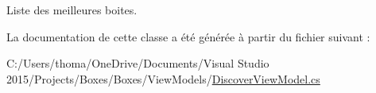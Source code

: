 Liste des meilleures boites. 



La documentation de cette classe a été générée à partir du fichier suivant \+:\begin{DoxyCompactItemize}
\item 
C\+:/\+Users/thoma/\+One\+Drive/\+Documents/\+Visual Studio 2015/\+Projects/\+Boxes/\+Boxes/\+View\+Models/\hyperlink{_discover_view_model_8cs}{Discover\+View\+Model.\+cs}\end{DoxyCompactItemize}
